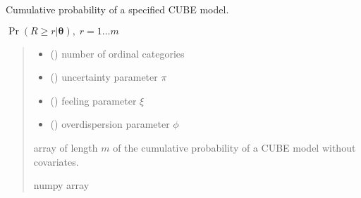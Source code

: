 \documentclass[letterpaper,10pt,english]{sphinxmanual}
\begin{document}
\begin{fulllineitems}
\label{\detokenize{cubmods:cubmods.cube.cmf}}
\pysigstartsignatures
{}
\pysigstopsignatures
\sphinxAtStartPar
Cumulative probability of a specified CUBE model.

\sphinxAtStartPar
\(\Pr(R \geq r | \pmb\theta),\; r=1 \ldots m\)
\begin{quote}\begin{description}
\begin{itemize}
\item {} 
\sphinxAtStartPar
{} () \textendash{} number of ordinal categories

\item {} 
\sphinxAtStartPar
{} () \textendash{} uncertainty parameter \(\pi\)

\item {} 
\sphinxAtStartPar
{} () \textendash{} feeling parameter \(\xi\)

\item {} 
\sphinxAtStartPar
{} () \textendash{} overdispersion parameter \(\phi\)

\end{itemize}

\sphinxAtStartPar
array of length \(m\) of the cumulative probability of a CUBE model without covariates.

\sphinxAtStartPar
numpy array

\end{description}\end{quote}

\end{fulllineitems}

\end{document}
